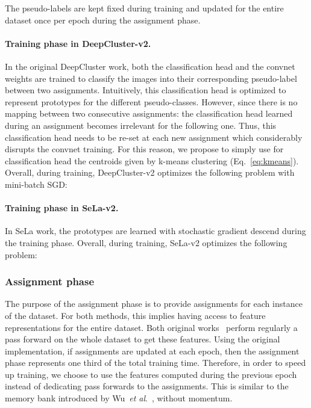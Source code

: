 \documentclass{article}
\def\onedot{.}
\def\etal{\emph{et al}\onedot}
\begin{document}
The pseudo-labels are kept fixed during training and updated for the entire dataset once per epoch during the assignment phase.

\paragraph{Training phase in DeepCluster-v2.}
In the original DeepCluster work, both the classification head  and the convnet weights are trained to classify the images into their corresponding pseudo-label between two assignments.
Intuitively, this classification head is optimized to represent prototypes for the different pseudo-classes.
However, since there is no mapping between two consecutive assignments: the classification head learned during an assignment becomes irrelevant for the following one.
Thus, this classification head needs to be re-set at each new assignment which considerably disrupts the convnet training.
For this reason, we propose to simply use for classification head  the centroids given by k-means clustering (Eq.~\ref{eq:kmeans}).
Overall, during training, DeepCluster-v2 optimizes the following problem with mini-batch SGD:


\paragraph{Training phase in SeLa-v2.}
In SeLa work, the prototypes  are learned with stochastic gradient descend during the training phase.
Overall, during training, SeLa-v2 optimizes the following problem:


\subsubsection{Assignment phase}
The purpose of the assignment phase is to provide assignments  for each instance of the dataset.
For both methods, this implies having access to feature representations  for the entire dataset.
Both original works~\cite{caron2018deep,asano2019self} perform regularly a pass forward on the whole dataset to get these features.
Using the original implementation, if assignments are updated at each epoch, then the assignment phase represents one third of the total training time.
Therefore, in order to speed up training, we choose to use the features computed during the previous epoch instead of dedicating pass forwards to the assignments.
This is similar to the memory bank introduced by Wu~\etal~\cite{wu2018unsupervised}, without momentum.
\end{document}
